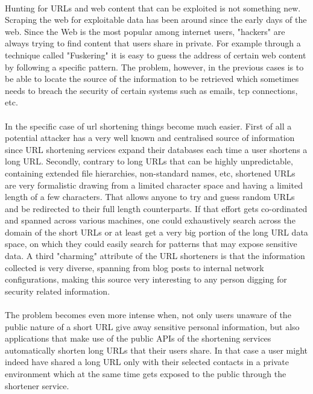 \documentclass[12pt]{article}
\begin{document}
\paragraph{}
Hunting for URLs and web content that can be exploited is not something new. Scraping the web for exploitable data has been around since the early days of the web. Since the Web is the most popular among internet users, "hackers" are always trying to find content that users share in private. For example through a technique called "Fuskering" it is easy to guess the address of certain web content by following a specific pattern. The problem, however, in the previous cases  is to be able to locate the source of the information to be retrieved which sometimes needs to breach the security of certain systems such as emails, tcp connections, etc.
\paragraph{}
In the specific case of url shortening things become much easier. First of all a potential attacker has a very well known and centralised source of information since URL shortening services expand their databases each time a user shortens a long URL. Secondly, contrary to long URLs that can be highly unpredictable, containing extended file hierarchies, non-standard names, etc, shortened URLs are very formalistic drawing from a limited character space and having a limited length of a few characters. That allows anyone to try and guess random URLs and be redirected to their full length counterparts. If that effort gets co-ordinated and spanned across various machines, one could exhaustively search across the domain of the short URLs or at least get a very big portion of the long URL data space, on which they could easily search for patterns that may expose sensitive data. A third "charming" attribute of the URL shorteners is that the information collected is very diverse, spanning from blog posts to internal network configurations, making this source very interesting to any person digging for security related information. 
\paragraph{}
The problem becomes even more intense when, not only users unaware of the public nature of a short URL give away sensitive personal information, but also applications that make use of the public APIs of the shortening services automatically shorten long URLs that their users share. In that case a user might indeed have shared a long URL only with their selected contacts in a private environment which at the same time gets exposed to the public through the shortener service. 
\end{document}
